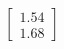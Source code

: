 \documentclass[preview]{standalone}
\begin{document}
\begin{align*}
\begin{bmatrix} 1.54 \\ 1.68 \end{bmatrix}
\end{align*}
\end{document}
